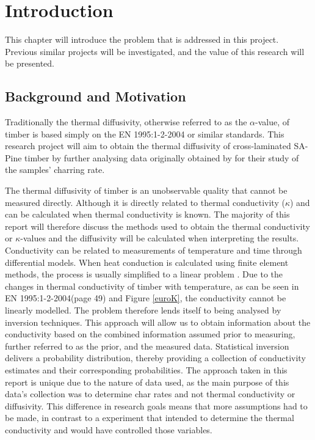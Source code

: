 \chapter{Introduction} \label{introduction}
This chapter will introduce the problem that is addressed in this project. 
Previous similar projects will be investigated, and the value of this research will be presented.

\section{Background and Motivation}

Traditionally the thermal diffusivity, otherwise referred to as the $\alpha$-value, of timber is based simply on the EN 1995:1-2-2004 or similar standards.
This research project will aim to obtain the thermal diffusivity of cross-laminated SA-Pine timber by further analysing data originally obtained by \citeauthor{Westhuyzen:2020} for their study of the samples' charring rate.


The thermal diffusivity of timber is an unobservable quality that cannot be measured directly.
Although it is directly related to thermal conductivity ($\kappa$) and can be calculated when thermal conductivity is known. 
The majority of this report will therefore discuss the methods used to obtain the thermal conductivity or $\kappa$-values and the diffusivity will be calculated when interpreting the results. 
Conductivity can be related to measurements of temperature and time through differential models. 
When heat conduction is calculated using finite element methods, the process is usually simplified to a linear problem \citep{Fish:2007}. 
Due to the changes in thermal conductivity of timber with temperature, as can be seen in EN 1995:1-2-2004(page 49) and Figure \ref{euroK}, the conductivity cannot be linearly modelled. 
The problem therefore lends itself to being analysed by inversion techniques. 
This approach will allow us to obtain information about the conductivity based on the combined information assumed prior to measuring, further referred to as the prior, and the measured data. 
Statistical inversion delivers a probability distribution, thereby providing a collection of conductivity estimates and their corresponding probabilities.
The approach taken in this report is unique due to the nature of data used, as the main purpose of this data's collection was to determine char rates and not thermal conductivity or diffusivity.
This difference in research goals means that more assumptions had to be made, in contrast to a experiment that intended to determine the thermal conductivity and would have controlled those variables. 

